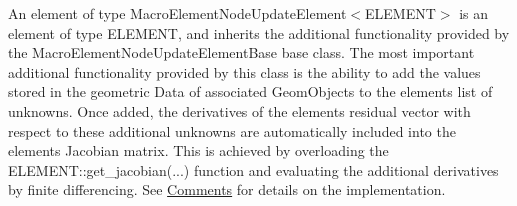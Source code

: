 An element of type {\ttfamily Macro\+Element\+Node\+Update\+Element$<$\+E\+L\+E\+M\+E\+N\+T$>$} is an element of type {\ttfamily E\+L\+E\+M\+E\+NT}, and inherits the additional functionality provided by the {\ttfamily Macro\+Element\+Node\+Update\+Element\+Base} base class. The most important additional functionality provided by this class is the ability to add the values stored in the geometric {\ttfamily Data} of associated {\ttfamily Geom\+Objects} to the element\textquotesingle{}s list of unknowns. Once added, the derivatives of the element\textquotesingle{}s residual vector with respect to these additional unknowns are automatically included into the element\textquotesingle{}s Jacobian matrix. This is achieved by overloading the {\ttfamily E\+L\+E\+M\+E\+N\+T\+::get\+\_\+jacobian}(...) function and evaluating the additional derivatives by finite differencing. See \hyperlink{index_comments}{Comments} for details on the implementation.

